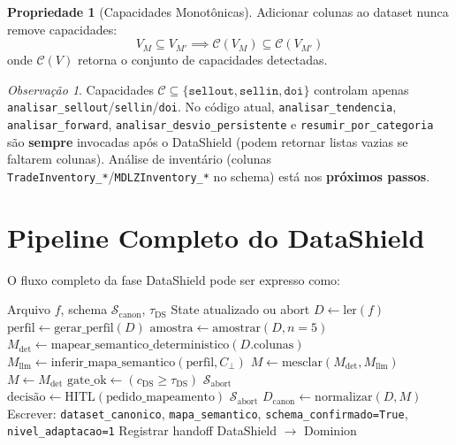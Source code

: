 \documentclass[a4paper, 12pt]{report}
\theoremstyle{definition}
\newtheorem{propriedade}{Propriedade}[chapter]
\theoremstyle{remark}
\newtheorem{observacao}{Observa\c{c}\~ao}[chapter]
\newcommand{\state}{\mathcal{S}}
\begin{document}
\begin{propriedade}[Capacidades Monot\^onicas]
  Adicionar colunas ao dataset nunca remove capacidades:
  \[
    V_M \subseteq V_{M'} \implies \mathcal{C}(V_M) \subseteq \mathcal{C}(V_{M'})
  \]
  onde $\mathcal{C}(V)$ retorna o conjunto de capacidades detectadas.
\end{propriedade}

\begin{observacao}
  Capacidades $\mathcal{C} \subseteq \{\texttt{sellout},\texttt{sellin},\texttt{doi}\}$
  controlam apenas \texttt{analisar\_sellout}/\texttt{sellin}/\texttt{doi}.
  No c\'odigo atual, \texttt{analisar\_tendencia}, \texttt{analisar\_forward},
  \texttt{analisar\_desvio\_persistente} e \texttt{resumir\_por\_categoria}
  s\~ao \textbf{sempre} invocadas ap\'os o DataShield (podem retornar
  listas vazias se faltarem colunas). An\'alise de invent\'ario
  (colunas \texttt{TradeInventory\_*}/\texttt{MDLZInventory\_*} no schema)
  est\'a nos \textbf{pr\'oximos passos}.
\end{observacao}


\section{Pipeline Completo do DataShield}

O fluxo completo da fase DataShield pode ser expresso como:

\begin{algorithm}[H]
\caption{DataShield -- Ingest\~ao e Normaliza\c{c}\~ao (N\'ivel 1 h\'ibrido)}
\begin{algorithmic}[1]
  \Require Arquivo $f$, schema $\mathcal{S}_{\text{canon}}$, $\tau_{\text{DS}}$
  \Ensure State atualizado ou abort
  \State $D \gets \text{ler}(f)$
  \State $\text{perfil} \gets \text{gerar\_perfil}(D)$
  \State $\text{amostra} \gets \text{amostrar}(D, n=5)$
  \State $M_{\text{det}} \gets \text{mapear\_semantico\_deterministico}(D.\text{colunas})$
    \State $M_{\text{llm}} \gets \text{inferir\_mapa\_semantico}(\text{perfil}, C_{\bot})$
    \State $M \gets \text{mesclar}(M_{\text{det}}, M_{\text{llm}})$
  \Else
    \State $M \gets M_{\text{det}}$
  \EndIf
  \State $\text{gate\_ok} \gets (c_{\text{DS}} \geq \tau_{\text{DS}})$
    \State \Return $\state_{\text{abort}}$ 
  \EndIf
  \State $\text{decis\~ao} \gets \text{HITL}(\text{pedido\_mapeamento})$
    \State \Return $\state_{\text{abort}}$
  \EndIf
  \State $D_{\text{canon}} \gets \text{normalizar}(D, M)$
  \State Escrever: \texttt{dataset\_canonico}, \texttt{mapa\_semantico},
    \texttt{schema\_confirmado=True}, \texttt{nivel\_adaptacao=1}
  \State Registrar handoff DataShield $\to$ Dominion
\end{algorithmic}
\end{algorithm}
\end{document}
